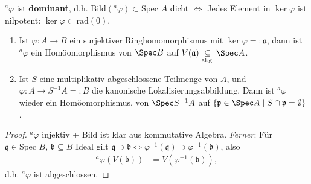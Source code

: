 \begin{cor}
  $^{a}\varphi$ ist \textbf{dominant},
  d.h. $\text{Bild}(^{a}\varphi)\subset\text{Spec }A$ dicht
  $\Leftrightarrow$ Jedes Element in $\ker\varphi$ ist nilpotent:
  $\ker\varphi\subset\text{rad}(0)$.
\end{cor}

\begin{prop} \mbox{}
  \begin{enumerate}
  \item Ist $\varphi:A\rightarrow B$ ein surjektiver
    Ringhomomorphismus mit $\ker\varphi=:\mathfrak{a}$, dann ist
    $^{a}\varphi$ ein Homöomorphismus von $\Spec B$ auf
    $V(\mathfrak{a})\underset{\text{abg.}}{\subseteq}\Spec A$.
  \item Ist $S$ eine multiplikativ abgeschlossene Teilmenge von $A$,
    und $\varphi:A\longrightarrow S^{-1}A=:B$ die kanonische
    Lokalisierungsabbildung.  Dann ist $^{a}\varphi$ wieder ein
    Homöomorphismus, von $\Spec S^{-1}A$ auf $\{\mathfrak{p}\in\Spec A\mid
    S\cap\mathfrak{p}=\emptyset\}$.
  \end{enumerate}
\end{prop}

\begin{proof}
  $^{a}\varphi$ injektiv + Bild ist klar aus kommutative Algebra.
  \emph{Ferner}: Für $\mathfrak{q}\in\text{Spec }B$,
  $\mathfrak{b}\subseteq B$ Ideal gilt
  $\mathfrak{q}\supset\mathfrak{b}\Leftrightarrow
  \varphi^{-1}(\mathfrak{q})\supset\varphi^{-1}(\mathfrak{b})$, also
  \begin{align*}
    ^{a}\varphi(V(\mathfrak{b})) & =V(\varphi^{-1}(\mathfrak{b})),
  \end{align*}
  d.h. $^{a}\varphi$ ist abgeschlossen.
\end{proof}
